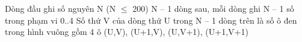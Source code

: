 Dòng đầu ghi số nguyên N (N $\le$ 200)  N – 1 dòng sau, mỗi dòng ghi N – 1 số trong phạm vi 0..4  Số thứ V của dòng thứ U trong N – 1 dòng trên là số ô đen trong hình vuông gồm 4 ô (U,V), (U+1,V), (U,V+1), (U+1,V+1)